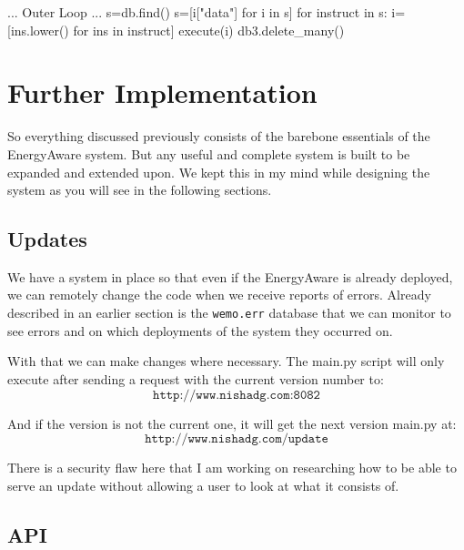 \documentclass{sig-alternate-05-2015}
\begin{document}
	\newcommand\pythonexternal[2][]{{
			\pythonstyle
			}}
	
	\newcommand\pythoninline[1]{{\pythonstyle\lstinline!#1!}}
\begin{python}
... Outer Loop ...
s=db.find()
s=[i["data"] for i in s]
for instruct in s:
	i=[ins.lower() for ins in instruct]
	execute(i)
db3.delete_many({})
\end{python}

\section{Further Implementation}

So everything discussed previously consists of the barebone essentials of the EnergyAware system. But any useful and complete system is built to be expanded and extended upon. We kept this in my mind while designing the system as you will see in the following sections.

\subsection{Updates}

We have a system in place so that even if the EnergyAware is already deployed, we can remotely change the code when we receive reports of errors. Already described in an earlier section is the \texttt{wemo.err} database that we can monitor to see errors and on which deployments of the system they occurred on.

With that we can make changes where necessary. The main.py script will only execute after sending a request with the current version number to:
\begin{equation*}
	\texttt{http://www.nishadg.com:8082} 
\end{equation*}

And if the version is not the current one, it will get the next version main.py at:
\begin{equation*}
	\texttt{http://www.nishadg.com/update} 
\end{equation*}

There is a security flaw here that I am working on researching how to be able to serve an update without allowing a user to look at what it consists of.

\subsection{API}
\end{document}
